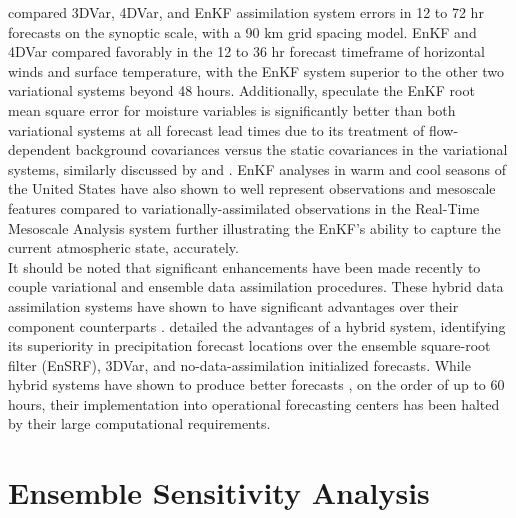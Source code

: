 \documentclass{ttuthes2007}
\newcommand{\tab}{\hspace*{2em}}  %
\begin{document}
\tab \cite{Zhangetal2011} compared 3DVar, 4DVar, and EnKF assimilation system errors in 12 to 72 hr forecasts on the synoptic scale, with a 90 km grid spacing model. EnKF and 4DVar compared favorably in the 12 to 36 hr forecast timeframe of horizontal winds and surface temperature, with the EnKF system superior to the other two variational systems beyond 48 hours. Additionally, \cite{Zhangetal2011} speculate the EnKF root mean square error for moisture variables is significantly better than both variational systems at all forecast lead times due to its treatment of flow-dependent background covariances versus the static covariances in the variational systems, similarly discussed by \cite{MengandZhang2008a} and \cite{TornandHakim2008a}. EnKF analyses in warm and cool seasons of the United States have also shown to well represent observations and mesoscale features compared to variationally-assimilated observations in the Real-Time Mesoscale Analysis system \citep{KnopfmeierandStensrud2013} further illustrating the EnKF's ability to capture the current atmospheric state, accurately.  \\ 

\tab It should be noted that significant enhancements have been made recently to couple variational and ensemble data assimilation procedures. These hybrid data assimilation systems have shown to have significant advantages over their component counterparts \citep{MengandZhang2011}. \cite{SchwartzandLiu2014} detailed the advantages of a hybrid system, identifying its superiority in precipitation forecast locations over the ensemble square-root filter (EnSRF), 3DVar, and no-data-assimilation initialized forecasts. While hybrid systems have shown to produce better forecasts \citep{Zhangetal2009,Zhang2010,ZhangandZhang2012}, on the order of up to 60 hours, their implementation into operational forecasting centers has been halted by their large computational requirements. \\

\section{Ensemble Sensitivity Analysis}
\end{document}
